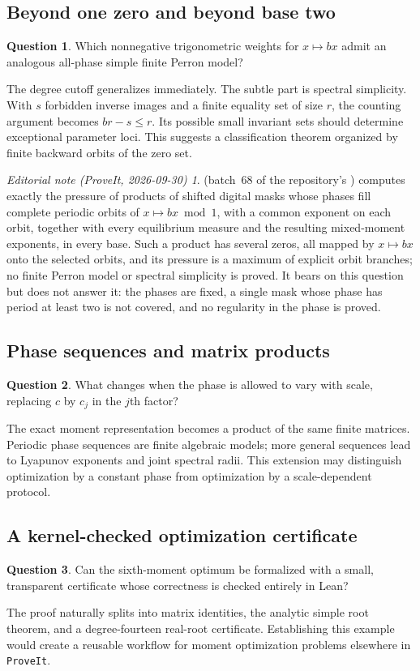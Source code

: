 \documentclass[11pt,a4paper]{article}
\numberwithin{equation}{section}
\theoremstyle{definition}
\newtheorem{question}[question]{Question}
\theoremstyle{remark}
\newtheorem*{ednote}{Editorial note (ProveIt, 2026-09-30)}
\newcommand{\repo}{\texttt{ProveIt}}
\begin{document}
\subsection{Beyond one zero and beyond base two}
\begin{question}
Which nonnegative trigonometric weights for $x\mapsto bx$ admit an
analogous all-phase simple finite Perron model?
\end{question}
The degree cutoff generalizes immediately. The subtle part is spectral
simplicity. With $s$ forbidden inverse images and a finite equality set
of size $r$, the counting argument becomes $br-s\leq r$. Its possible
small invariant sets should determine exceptional parameter loci.
This suggests a classification theorem organized by finite backward
orbits of the zero set.
\begin{ednote}
 (batch~68 of
the repository's ) computes exactly the pressure of
products of shifted digital masks whose phases fill complete periodic
orbits of $x\mapsto bx\bmod1$, with a common exponent on each orbit,
together with every equilibrium measure and the resulting mixed-moment
exponents, in every base. Such a product has several zeros, all mapped by $x\mapsto bx$ onto the selected orbits, and its pressure is a maximum of explicit orbit branches; no finite Perron model or spectral simplicity is proved. It bears on this question but does not
answer it: the phases are fixed, a single mask whose phase has period at
least two is not covered, and no regularity in the phase is proved.
\end{ednote}

\subsection{Phase sequences and matrix products}
\begin{question}
What changes when the phase is allowed to vary with scale, replacing
$c$ by $c_j$ in the $j$th factor?
\end{question}
The exact moment representation becomes a product of the same finite
matrices. Periodic phase sequences are finite algebraic models; more
general sequences lead to Lyapunov exponents and joint spectral radii.
This extension may distinguish optimization by a constant phase from
optimization by a scale-dependent protocol.

\subsection{A kernel-checked optimization certificate}
\begin{question}
Can the sixth-moment optimum be formalized with a small, transparent
certificate whose correctness is checked entirely in Lean?
\end{question}
The proof naturally splits into matrix identities, the analytic simple
root theorem, and a degree-fourteen real-root certificate. Establishing
this example would create a reusable workflow for moment optimization
problems elsewhere in \repo.
\end{document}
